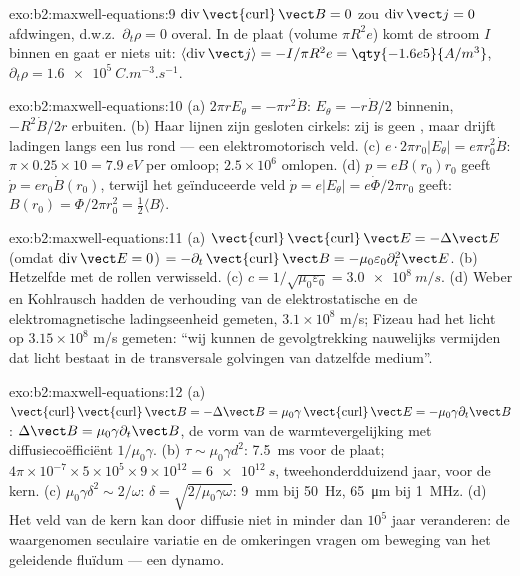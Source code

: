 \begin{solution}{exo:b2:maxwell-equations:9}
$\operatorname{div}\operatorname{\vect{curl}}\vect B = 0$ zou
$\operatorname{div}\vect j =
0$ afdwingen, d.w.z.\ $\partial_t\rho = 0$
overal. In de plaat (volume $\pi R^2e$) komt de stroom $I$ binnen en gaat er
niets uit:
$\langle\operatorname{div}\vect j\rangle =
-I/\pi R^2e = \qty{-1.6e5}{A/m^3}$,
$\partial_t\rho = \qty{+1.6e5}{C.m^{-3}.s^{-1}}$.
\end{solution}

\begin{solution}{exo:b2:maxwell-equations:10}
(a) $2\pi rE_\theta = -\pi r^2\dot B$: $E_\theta = -r\dot B/2$ binnenin,
$-R^2\dot B/2r$ erbuiten. (b) Haar lijnen zijn gesloten cirkels: zij is geen
, maar drijft ladingen langs een lus rond --- een elektromotorisch
veld. (c) $e\cdot2\pi r_0
|E_\theta| = e\pi r_0^2\dot B$:
$\pi \times 0.25 \times 10 = \qty{7.9}{eV}$ per omloop; $2.5 \times 10^6$
omlopen. (d) $p = eB(r_0)r_0$ geeft $\dot p = er_0\dot B(r_0)$, terwijl het
geïnduceerde veld $\dot p = e|E_\theta| = e\dot\Phi/2\pi r_0$ geeft:
$B(r_0) = \Phi/2\pi r_0^2 =
\tfrac12\langle B\rangle$.
\end{solution}

\begin{solution}{exo:b2:maxwell-equations:11}
(a)
$\operatorname{\vect{curl}}\operatorname{\vect{curl}}\vect E = -\Delta\vect E$
(omdat $\operatorname{div}
\vect E = 0$)
$= -\partial_t\operatorname{\vect{curl}}\vect B = -\mu_0\varepsilon_0\partial_t^2\vect E$.
(b) Hetzelfde met de rollen verwisseld. (c)
$c = 1/\sqrt{\mu_0\varepsilon_0} = \qty{3.0e8}{m/s}$. (d) Weber en
Kohlrausch hadden de verhouding van de elektrostatische en de
elektromagnetische ladingseenheid gemeten, $3.1 \times 10^8$ m/s; Fizeau had
het licht op $3.15 \times 10^8$ m/s gemeten: ``wij kunnen de gevolgtrekking
nauwelijks vermijden dat licht bestaat in de transversale golvingen van
datzelfde medium''.
\end{solution}

\begin{solution}{exo:b2:maxwell-equations:12}
(a)
$\operatorname{\vect{curl}}\operatorname{\vect{curl}}\vect B = -\Delta\vect B = \mu_0\gamma\operatorname{\vect{curl}}
\vect E = -\mu_0\gamma\partial_t\vect B$:
$\Delta\vect B = \mu_0\gamma\partial_t\vect B$, de vorm van de
warmtevergelijking met diffusiecoëfficiënt $1/\mu_0\gamma$. (b)
$\tau \sim \mu_0\gamma d^2$: \qty{7.5}{ms} voor de plaat;
$4\pi \times 10^{-7} \times 5 \times 10^5 \times 9 \times 10^{12} = \qty{6e12}{s}$,
tweehonderdduizend jaar, voor de kern. (c)
$\mu_0\gamma\delta^2 \sim 2/\omega$: $\delta = \sqrt{2/\mu_0
\gamma\omega}$:
\qty{9}{mm} bij \qty{50}{Hz}, \qty{65}{\micro m} bij \qty{1}{MHz}. (d) Het
veld van de kern kan door diffusie niet in minder dan $10^5$ jaar
veranderen: de waargenomen seculaire variatie en de omkeringen vragen om
beweging van het geleidende fluïdum --- een dynamo.
\end{solution}

